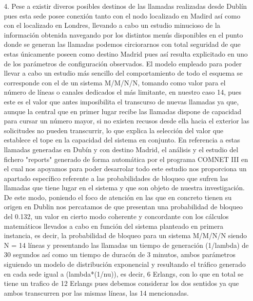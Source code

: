 4.
Pese a existir diveros posibles destinos de las llamadas realizadas desde Dublín pues esta sede posee conexión tanto con el nodo localizado en Madird así como con el localizado en Londres, llevando a cabo un estudio minucioso de la información obtenida navegando por los distintos menús disponibles en el punto donde se generan las llamadas podemos circiorarnos con total seguridad de que estas únicamente poseen como destino Madrid pues así resulta explicitado en uno de los parámetros de configuración observados. El modelo empleado para poder llevar a cabo un estudio más sencillo del comportamiento de todo el esquema se corresponde con el de un sistema M/M/N/N, tomando como valor para el número de líneas o canales dedicados el más limitante, en nuestro caso 14, pues este es el valor que antes imposibilita el transcurso de nuevas llamadas ya que, aunque la central que en primer lugar recibe las llamadas dispone de capacidad para cursar un número mayor, si no existen recusos desde ella hacia el exterior las solicitudes no pueden transcurrir, lo que explica la selección del valor que establece el tope en la capacidad del sistema en conjunto. En referencia a estas llamadas generadas en Dubín y con destino Madrid, el análisis y el estudio del fichero "reports" generado de forma automática por el programa COMNET III en el cual nos apoyamos para poder desarrolar todo este estudio nos proporciona un apartado específico referente a las probabilidades de bloqueo que sufren las llamadas que tiene lugar en el sistema y que son objeto de nuestra investigación. De este modo, poniendo el foco de atención en las que en concreto tienen su origen en Dublin nos percatamos de que presentan una probabilidad de bloqueo del 0.132, un valor en cierto modo coherente y concordante con los cálculos matemáticos llevados a cabo en función del sistema planteado en primera instancia, es decir, la probabilidad de bloqueo para un sistema M/M/N/N siendo N = 14 líneas y presentando las llamadas un tiempo de generación (1/lambda) de 30 segundos así como un tiempo de duracón de 3 minutos, ambos parámetros siguiendo un modelo de distribución exponencial y resultando el tráfico generado en cada sede igual a (lambda*(1/nu)), es decir, 6 Erlangs, con lo que en total se tiene un trafico de 12 Erlangs pues debemos considerar los dos sentidos ya que ambos transcurren por las mismas líneas, las 14 mencionadas.

